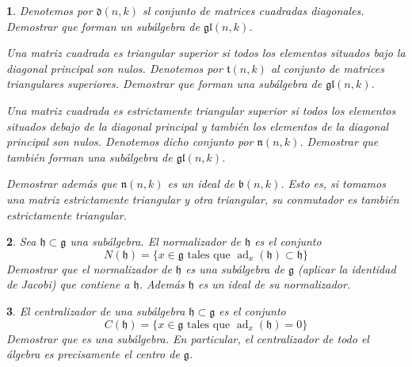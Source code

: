 \documentclass[a4paper,draft,12pt]{scrartcl}
\newtheorem{pro1}{}%
\newenvironment{pro}{\begin{pro1} \rm} {\end{pro1}}
\newcommand{\g}{\mathfrak{g}}%
\newcommand{\df}[1]{\textsf{\color{blue}#1}}
\DeclareMathOperator{\ad}{ad}  %
\begin{document}
\begin{pro}

Denotemos por $\mathfrak{d}(n,k)$ sl conjunto de matrices cuadradas diagonales. Demostrar que forman un subálgebra de $\mathfrak{gl}(n,k)$.

Una matriz cuadrada es \df{triangular superior}  si todos los elementos situados bajo la diagonal principal son nulos. Denotemos por $\mathfrak{t}(n,k)$ al conjunto de matrices triangulares superiores. Demostrar que forman una subálgebra de $\mathfrak{gl}(n,k)$.

Una matriz cuadrada es \df{estrictamente triangular superior}  si todos los elementos situados debajo de la diagonal principal y también los elementos de la diagonal principal son nulos. Denotemos dicho conjunto por $\mathfrak{n}(n,k)$. Demostrar que también forman una subálgebra de $\mathfrak{gl}(n,k)$.

Demostrar además que  $\mathfrak{n}(n,k)$ es un ideal de $\mathfrak{b}(n,k)$. Esto es, si tomamos una matriz estrictamente triangular y otra triangular, su conmutador es también estrictamente triangular.

\end{pro}

\begin{pro}

 Sea $\mathfrak{h} \subset \g$ una subálgebra.  El \df{normalizador}  de $\mathfrak{h}$ es el conjunto
\[
N(\mathfrak{h})= \{ x  \in \g \text{ tales que } \ad_x(\mathfrak{h})\subset \mathfrak{h}\}
\]
Demostrar que el  normalizador de $\mathfrak{h}$ es una subálgebra de $\g$ (aplicar la identidad de Jacobi) que contiene a $\mathfrak{h}$.  Además $\mathfrak{h}$ es un ideal de su normalizador.

\end{pro}


\begin{pro}

 El \df{centralizador}  de una subálgebra $\mathfrak{h} \subset \g$ es el conjunto
\[
C(\mathfrak{h})= \{ x \in \g \text{ tales que } \ad_x(\mathfrak{h})=0\}
\]
Demostrar que es  una subálgebra. En particular, el centralizador de todo el álgebra es precisamente el centro de $\g$.

\end{pro}
\end{document}
